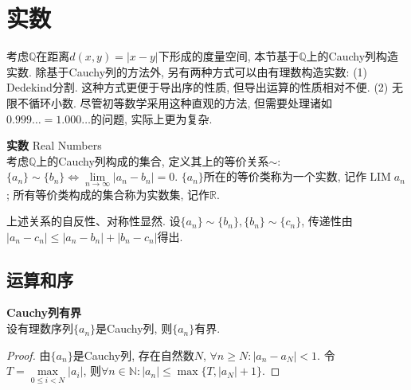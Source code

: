 \section{实数}

\par 考虑$\mathbb{Q}$在距离$d(x,y)=|x-y|$下形成的度量空间, 本节基于$\mathbb{Q}$上的Cauchy列构造实数. 除基于Cauchy列的方法外, 另有两种方式可以由有理数构造实数: (1) Dedekind分割. 这种方式更便于导出序的性质, 但导出运算的性质相对不便. (2) 无限不循环小数. 尽管初等数学采用这种直观的方法, 但需要处理诸如$0.999\dots=1.000\dots$的问题, 实际上更为复杂. 


\begin{dfn} \textbf{实数} Real Numbers\\
考虑$\mathbb{Q}$上的Cauchy列构成的集合, 定义其上的等价关系$\sim$: $\{a_n\}\sim \{b_n\} \iff \lim\limits_{n\to \infty} |a_n-b_n|=0$. $\{a_n\}$所在的等价类称为一个实数, 记作$\operatorname{LIM} a_n$; 所有等价类构成的集合称为实数集, 记作$\mathbb{R}$. 
\end{dfn}
上述关系的自反性、对称性显然. 设$\{a_n\}\sim \{b_n\}, \{b_n\}\sim \{c_n\}$, 传递性由$|a_n-c_n|\le |a_n-b_n|+|b_n-c_n|$得出. 

\subsection{运算和序}

\begin{pro} \textbf{Cauchy列有界} \\
设有理数序列$\{a_n\}$是Cauchy列, 则$\{a_n\}$有界.
\end{pro}
\begin{proof}
由$\{a_n\}$是Cauchy列, 存在自然数$N$, $\forall  n\ge N: |a_n-a_N|<1$. 令$T=\max\limits_{0\le i< N} |a_i|$, 则$\forall n\in \mathbb{N}: |a_n|\le \max \{T, |a_N|+1\}$. 
\end{proof}

